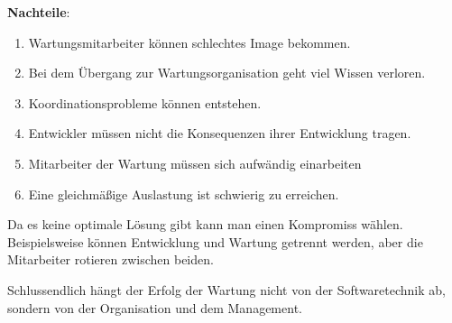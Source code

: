 \documentclass[a4paper]{article}
\theoremstyle{break}
\begin{document}
\textbf{Nachteile}:
\begin{enumerate}
\item Wartungsmitarbeiter können schlechtes Image bekommen.
\item Bei dem Übergang zur Wartungsorganisation geht viel Wissen verloren.
\item Koordinationsprobleme können entstehen.
\item Entwickler müssen nicht die Konsequenzen ihrer Entwicklung tragen.
\item Mitarbeiter der Wartung müssen sich aufwändig einarbeiten
\item Eine gleichmä\ss{}ige Auslastung ist schwierig zu erreichen.
\end{enumerate}

Da es keine optimale Lösung gibt kann man einen Kompromiss wählen. Beispielsweise können Entwicklung und Wartung getrennt werden, aber die Mitarbeiter rotieren zwischen beiden.

Schlussendlich hängt der Erfolg der Wartung nicht von der Softwaretechnik ab, sondern von der Organisation und dem Management.
\end{document}
